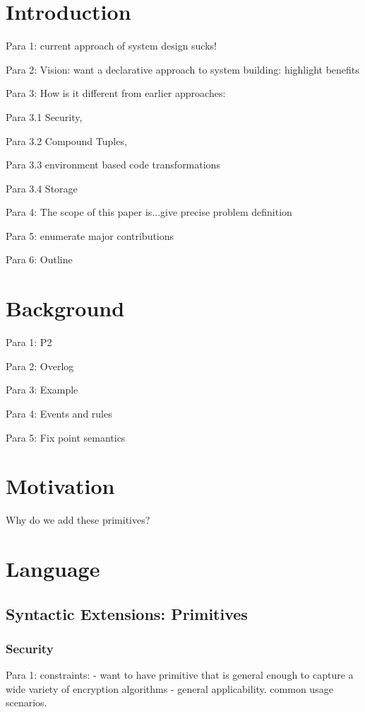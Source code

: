 \section{Introduction}
Para 1: current approach of system design sucks!

Para 2: Vision: want a declarative approach to system building: highlight benefits

Para 3: How is it different from earlier approaches: 

Para 3.1 Security, 

Para 3.2 Compound Tuples, 

Para 3.3 environment based code transformations

Para 3.4 Storage

Para 4: The scope of this paper is...give precise problem definition

Para 5: enumerate major contributions

Para 6: Outline

\section{Background}

Para 1: P2

Para 2: Overlog

Para 3: Example

Para 4: Events and rules

Para 5: Fix point semantics

\section{Motivation}

Why do we add these primitives?

\section{Language}

\subsection{Syntactic Extensions: Primitives}

\subsubsection{Security}

Para 1: 
constraints: 
- want to have primitive that is general enough to capture a wide variety of encryption algorithms
- 
general applicability. 
common usage scenarios. 


